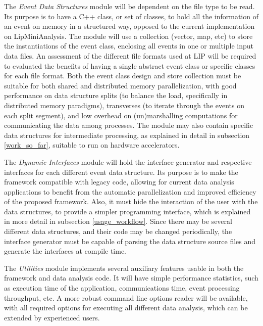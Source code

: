 The \textit{Event Data Structures} module will be dependent on the file type to be read. Its purpose is to have a C++ class, or set of classes, to hold all the information of an event on memory in a structured way, opposed to the current implementation on LipMiniAnalysis. The module will use a collection (vector, map, etc) to store the instantiations of the event class, enclosing all events in one or multiple input data files. An assessment of the different file formats used at LIP will be required to evaluated the benefits of having a single abstract event class or specific classes for each file format. Both the event class design and store collection must be suitable for both shared and distributed memory parallelization, with good performance on data structure splits (to balance the load, specifically in distributed memory paradigms), transverses (to iterate through the events on each split segment), and low overhead on (un)marshalling computations for communicating the data among processes. The module may also contain specific data structures for intermediate processing, as explained in detail in subsection \ref{work_so_far}, suitable to run on hardware accelerators.

The \textit{Dynamic Interfaces} module will hold the interface generator and respective interfaces for each different event data structure. Its purpose is to make the framework compatible with legacy code, allowing for current data analysis applications to benefit from the automatic parallelization and improved efficiency of the proposed framework. Also, it must hide the interaction of the user with the data structures, to provide a simpler programming interface, which is explained in more detail in subsection \ref{usage_workflow}. Since there may be several different data structures, and their code may be changed periodically, the interface generator must be capable of parsing the data structure source files and generate the interfaces at compile time.

The \textit{Utilities} module implements several auxiliary features usable in both the framework and data analysis code. It will have simple performance statistics, such as execution time of the application, communications time, event processing throughput, etc. A more robust command line options reader will be available, with all required options for executing all different data analysis, which can be extended by experienced users.

